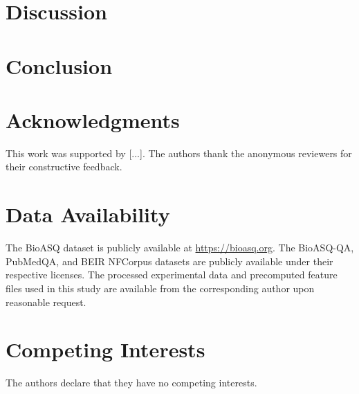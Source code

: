\documentclass[11pt]{article}
\begin{document}
\section{Discussion}
\label{sec:discussion}

\section{Conclusion}


\section*{Acknowledgments}
This work was supported by [...]. The authors thank the anonymous reviewers for their constructive feedback.

\section*{Data Availability}
The BioASQ dataset is publicly available at \url{https://bioasq.org}. The BioASQ-QA, PubMedQA, and BEIR NFCorpus datasets are publicly available under their respective licenses. The processed experimental data and precomputed feature files used in this study are available from the corresponding author upon reasonable request.

\section*{Competing Interests}
The authors declare that they have no competing interests.

\appendix




\end{document}
